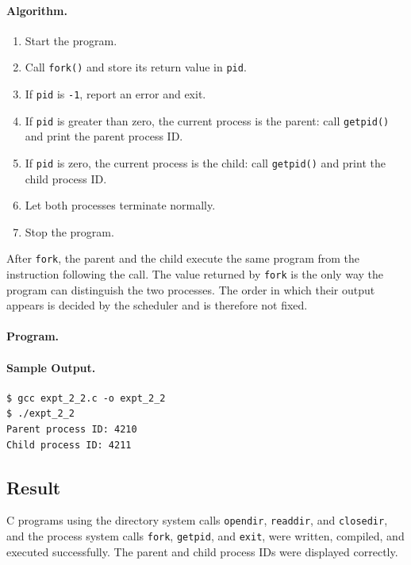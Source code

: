 \paragraph{Algorithm.}
\begin{enumerate}
    \item Start the program.
    \item Call \texttt{fork()} and store its return value in \texttt{pid}.
    \item If \texttt{pid} is \texttt{-1}, report an error and exit.
    \item If \texttt{pid} is greater than zero, the current process is the parent: call \texttt{getpid()} and print the parent process ID.
    \item If \texttt{pid} is zero, the current process is the child: call \texttt{getpid()} and print the child process ID.
    \item Let both processes terminate normally.
    \item Stop the program.
\end{enumerate}

\begin{infobox}
After \texttt{fork}, the parent and the child execute the same program from the instruction following the call. The value returned by \texttt{fork} is the only way the program can distinguish the two processes. The order in which their output appears is decided by the scheduler and is therefore not fixed.
\end{infobox}

\paragraph{Program.}


\paragraph{Sample Output.}
\begin{lstlisting}[style=outputstyle, caption={Parent and child process IDs}]
$ gcc expt_2_2.c -o expt_2_2
$ ./expt_2_2
Parent process ID: 4210
Child process ID: 4211
\end{lstlisting}

\subsection*{Result}
C programs using the directory system calls \texttt{opendir}, \texttt{readdir}, and \texttt{closedir}, and the process system calls \texttt{fork}, \texttt{getpid}, and \texttt{exit}, were written, compiled, and executed successfully. The parent and child process IDs were displayed correctly.

